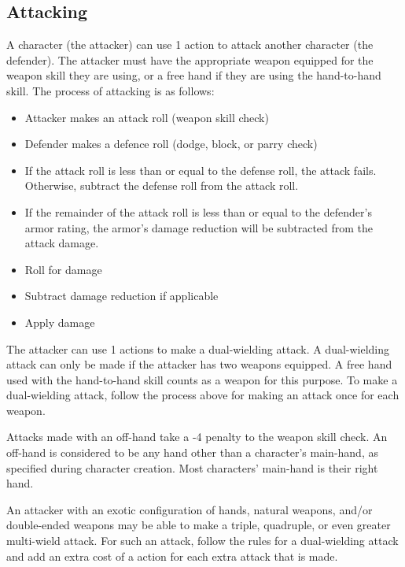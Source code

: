 \begin{multicols*}{2}
    \section{Attacking}
    A character (the attacker) can use 1 action to attack another character
    (the defender). The attacker must have the appropriate weapon equipped
    for the weapon skill they are using, or a free hand if they are using
    the hand-to-hand skill. The process of attacking is as follows:
    \begin{itemize}
        \item Attacker makes an attack roll (weapon skill check)
        \item Defender makes a defence roll (dodge, block, or parry check)
        \item If the attack roll is less than or equal to the defense roll, the
                attack fails. Otherwise, subtract the defense roll from the
                attack roll.
        \item If the remainder of the attack roll is less than or equal to the
                defender's armor rating, the armor's damage reduction will be
                subtracted from the attack damage.
        \item Roll for damage
        \item Subtract damage reduction if applicable
        \item Apply damage
    \end{itemize}

    The attacker can use 1 \textonehalf actions to make a dual-wielding
    attack. A dual-wielding attack can only be made if the attacker has
    two weapons equipped. A free hand used with the hand-to-hand skill counts
    as a weapon for this purpose. To make a dual-wielding attack, follow the
    process above for making an attack once for each weapon.

    Attacks made with an off-hand take a -4 penalty to the weapon skill check.
    An off-hand is considered to be any hand other than a character's
    main-hand, as specified during character creation. Most characters'
    main-hand is their right hand.

    An attacker with an exotic configuration of hands, natural weapons,
    and/or double-ended weapons may be able to make a triple, quadruple,
    or even greater multi-wield attack. For such an attack, follow the rules
    for a dual-wielding attack and add an extra cost of a \textonehalf action
    for each extra attack that is made.
\end{multicols*}
